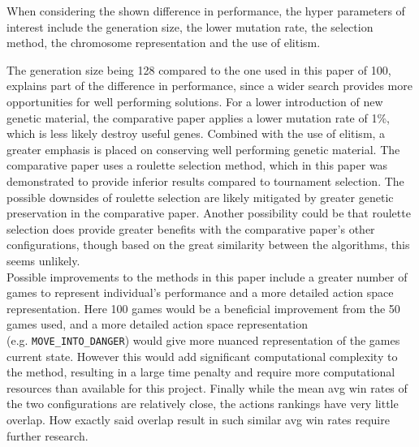 When considering the shown difference in performance, the hyper parameters of interest 
include the generation size, the lower mutation rate, the selection method,
the chromosome representation and the use of elitism.\par
The generation size being 128 compared to the one used in this paper of 100, 
explains part of the difference in performance, since a wider search provides more 
opportunities for well performing solutions.
For a lower introduction of new genetic material, the comparative paper applies a
lower mutation rate of 1\%, which is less likely destroy useful genes.
Combined with the use of elitism, a greater emphasis is placed on conserving 
well performing genetic material.
The comparative paper uses a roulette selection method, which in this paper was demonstrated to 
provide inferior results compared to tournament selection. 
The possible downsides of roulette selection are likely 
mitigated by greater genetic preservation in the comparative paper. 
Another possibility could be that roulette selection does provide greater 
benefits with the comparative paper's other configurations, though based on 
the great similarity between the algorithms, this seems unlikely.\\
Possible improvements to the methods in this paper include 
a greater number of games to represent individual's performance and 
a more detailed action space representation.
Here 100 games would be a beneficial improvement from the 50 games used, 
and a more detailed action space representation \\ (e.g. \texttt{MOVE\_INTO\_DANGER})
would give more nuanced representation of the games current state.
However this would add significant computational complexity to the method, 
resulting in a large time penalty and require more computational 
resources than available for this project.
Finally while the mean avg win rates of the two configurations are 
relatively close, the actions rankings have very little overlap. How exactly
said overlap result in such similar avg win rates require further research.
